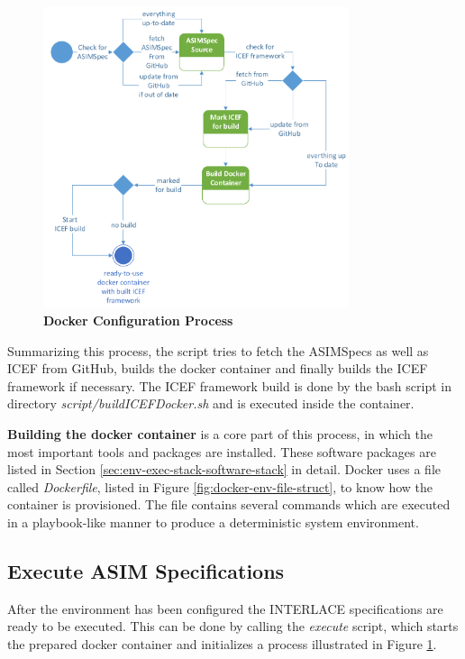 \begin{figure}[htbp]
  \centering
  \includegraphics[width=0.8\textwidth, clip, trim=1mm 1mm 1mm 1mm]{Figures/docker_configure}
  \caption{\bf\small Docker Configuration Process}
  \label{fig:docker-env-config-process}
\end{figure}

Summarizing this process, the script tries to fetch the ASIMSpecs as well as ICEF from GitHub, builds the docker container and finally builds the ICEF framework if necessary. The ICEF framework build is done by the bash script in directory \textit{script/buildICEFDocker.sh} and is executed inside the container.

\textbf{Building the docker container} is a core part of this process, in which the most important tools and packages are installed. These software packages are listed in Section \ref{sec:env-exec-stack-software-stack} in detail. Docker uses a file called \textit{Dockerfile}, listed in Figure \ref{fig:docker-env-file-struct}, to know how the container is provisioned. The file contains several commands which are executed in a playbook-like manner to produce a deterministic system environment.

\subsection{Execute ASIM Specifications}

After the environment has been configured the INTERLACE specifications are ready to be executed. This can be done by calling the \textit{execute} script, which starts the prepared docker container and initializes a process illustrated in Figure \ref{fig:docker-env-config-process}.

